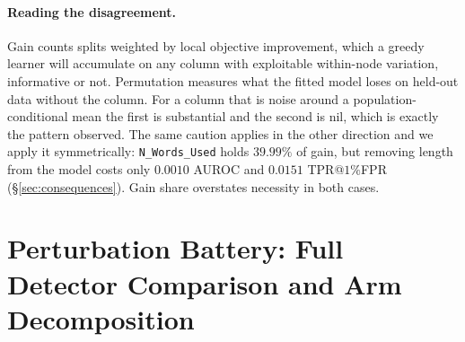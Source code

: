 \documentclass{article}
\begin{document}
\paragraph{Reading the disagreement.} Gain counts splits weighted by local
objective improvement, which a greedy learner will accumulate on any column with
exploitable within-node variation, informative or not. Permutation measures what
the fitted model loses on held-out data without the column. For a column that is
noise around a population-conditional mean the first is substantial and the
second is nil, which is exactly the pattern observed. The same caution applies in
the other direction and we apply it symmetrically: \texttt{N\_Words\_Used} holds
$39.99\%$ of gain, but removing length from the model costs only $0.0010$ AUROC
and $0.0151$ TPR@$1\%$FPR (\S\ref{sec:consequences}). Gain share overstates
necessity in both cases.

\section{Perturbation Battery: Full Detector Comparison and Arm Decomposition}
\label{app:battery}
\end{document}
